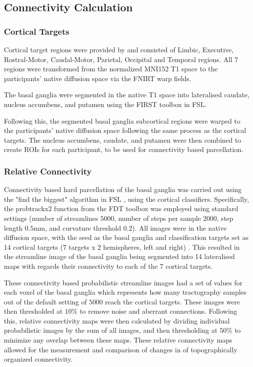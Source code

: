 \subsection{Connectivity Calculation}

\subsubsection{Cortical Targets}
Cortical target regions were provided by  and consisted of Limbic, Executive, Rostral-Motor, Caudal-Motor, Parietal, Occipital and Temporal regions. All 7 regions were transformed from the normalized MNI152 T1 space to the participants’ native diffusion space via the \ac{FNIRT} warp fields.\par
The basal ganglia were segmented in the native T1 space into lateralised caudate, nucleus accumbens, and putamen using the FIRST toolbox in \ac{FSL}.\par
Following this, the segmented basal ganglia subcortical regions were warped to the participants’ native diffusion space following the same process as the cortical targets. The nucleus accumbens, caudate, and putamen were then combined to create \ac{ROI}s for each participant, to be used for connectivity based parcellation.

\subsubsection{Relative Connectivity}

Connectivity based hard parcellation of the basal ganglia was carried out using the "find the biggest" algorithm in \ac{FSL} \cite{biggest}, using the cortical classifiers. Specifically, the probtrackx2 function from the \ac{FDT} toolbox was employed using standard settings (number of streamlines $5000$, number of steps per sample $2000$, step length $0.5$mm, and curvature threshold $0.2$). All images were in the native diffusion space, with the seed as the basal ganglia and classification targets set as 14 cortical targets ($7$ targets x $2$ hemispheres, left and right) \cite{tract}. This resulted in the streamline image of the basal ganglia being segmented into 14 lateralised maps with regards their connectivity to each of the 7 cortical targets.\par
These connectivity based probabilistic streamline images had a set of values for each voxel of the basal ganglia which represents how many tractography samples out of the default setting of $5000$ reach the cortical targets. These images were then thresholded at $10$\% to remove noise and aberrant connections. Following this, relative connectivity maps were then calculated by dividing individual probabilistic images by the sum of all images, and then thresholding at $50$\% to minimize any overlap between these maps. These relative connectivity maps allowed for the measurement and comparison of changes in of topographically organized connectivity.

